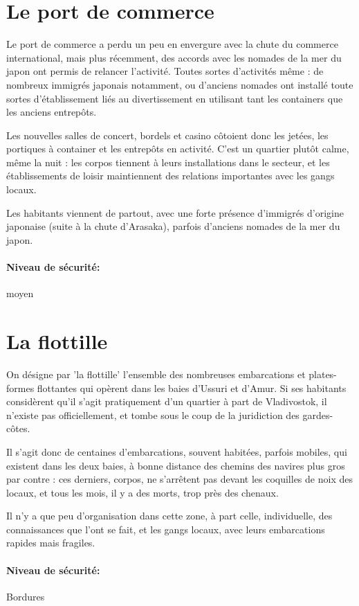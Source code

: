 \documentclass[10pt,a4paper]{book}
\begin{document}
\section{Le port de commerce}
Le port de commerce a perdu un peu en envergure avec la chute du commerce international, mais plus récemment, des accords avec les nomades de la mer du japon ont permis de relancer l'activité. Toutes sortes d'activités même : de nombreux immigrés japonais notamment, ou d'anciens nomades ont installé toute sortes d'établissement liés au divertissement en utilisant tant les containers que les anciens entrepôts. 

Les nouvelles salles de concert, bordels et casino côtoient donc les jetées, les portiques à container et les entrepôts en activité. C'est un quartier plutôt calme, même la nuit : les corpos tiennent à leurs installations dans le secteur, et les établissements de loisir maintiennent des relations importantes avec les gangs locaux.

Les habitants viennent de partout, avec une forte présence d'immigrés d'origine japonaise (suite à la chute d'Arasaka), parfois d'anciens nomades de la mer du japon.
\paragraph{Niveau de sécurité:}moyen
\section{La flottille}
On désigne par 'la flottille' l'ensemble des nombreuses embarcations et plates-formes flottantes qui opèrent dans les baies d'Ussuri et d'Amur. Si ses habitants considèrent qu'il s'agit pratiquement d'un quartier à part de Vladivostok, il n'existe pas officiellement, et tombe sous le coup de la juridiction des gardes-côtes.

Il s'agit donc de centaines d'embarcations, souvent habitées, parfois mobiles, qui existent dans les deux baies, à bonne distance des chemins des navires plus gros par contre : ces derniers, corpos, ne s'arrêtent pas devant les coquilles de noix des locaux, et tous les mois, il y a des morts, trop près des chenaux.

Il n'y a que peu d'organisation dans cette zone, à part celle, individuelle, des connaissances que l'ont se fait, et les gangs locaux, avec leurs embarcations rapides mais fragiles.
\paragraph{Niveau de sécurité:}Bordures
\end{document}
